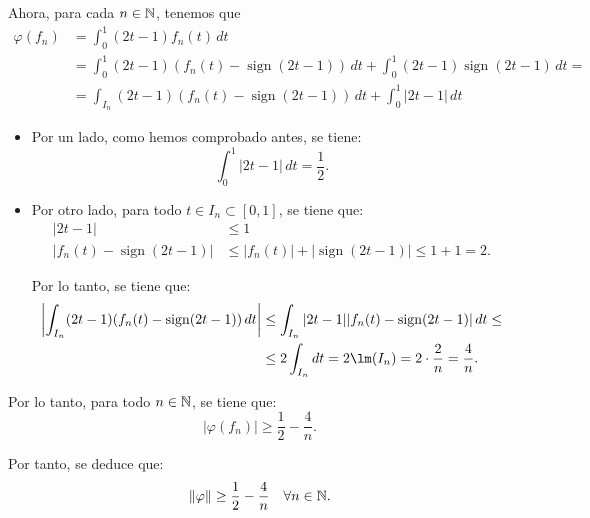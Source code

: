 \documentclass[12pt]{article}
\begin{document}
\begin{ejercicio}
\begin{enumerate}[label=\alph*)]
            Ahora, para cada $n \in \mathbb{N}$, tenemos que
            \begin{align*}
                \varphi(f_n) &= \int_0^1 (2t - 1) f_n(t) \, dt \\
                &= \int_0^1 (2t - 1)(f_n(t) - \operatorname{sign}(2t - 1)) \, dt + \int_0^1 (2t - 1) \operatorname{sign}(2t - 1) \, dt
                =\\&= \int_{I_n} (2t - 1)(f_n(t) - \operatorname{sign}(2t - 1)) \, dt + \int_0^1 |2t - 1| \, dt
            \end{align*}
            \begin{itemize}
                \item Por un lado, como hemos comprobado antes, se tiene:
                \begin{equation*}
                    \int_0^1 |2t - 1| \, dt = \frac{1}{2}.
                \end{equation*}
                \item Por otro lado, para todo $t \in I_n\subset [0, 1]$, se tiene que:
                \begin{align*}
                    |2t - 1| &\leq 1\\
                    |f_n(t) - \operatorname{sign}(2t - 1)| &\leq |f_n(t)| + |\operatorname{sign}(2t - 1)| \leq 1 + 1 = 2.
                \end{align*}

                Por lo tanto, se tiene que:
                \begin{align*}
                    \left|\int_{I_n} (2t - 1)(f_n(t) - \operatorname{sign}(2t - 1)) \, dt\right| & \leq \int_{I_n} |2t - 1| |f_n(t) - \operatorname{sign}(2t - 1)| \, dt \leq \\ & \leq 2 \int_{I_n} dt = 2 \lm(I_n) = 2 \cdot \frac{2}{n} = \frac{4}{n}.
                \end{align*}
            \end{itemize}

            Por lo tanto, para todo $n \in \mathbb{N}$, se tiene que:
            \begin{equation*}
                |\varphi(f_n)| \geq \frac{1}{2} - \frac{4}{n}.
            \end{equation*}

            Por tanto, se deduce que:
            \begin{equation*}
                \|\varphi\| \geq \frac{1}{2} - \frac{4}{n} \quad \forall n \in \mathbb{N}.
            \end{equation*}


\end{enumerate}
\end{ejercicio}
\end{document}
